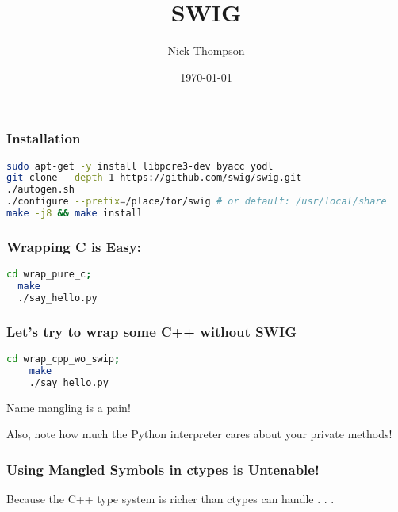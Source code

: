 \documentclass{beamer}
\begin{document}
\title{SWIG}
\author{Nick Thompson} 
\date{\today} 

\frame{\titlepage} 


\begin{frame}[fragile]
\frametitle{Installation}

\begin{lstlisting}[language=bash]
sudo apt-get -y install libpcre3-dev byacc yodl
git clone --depth 1 https://github.com/swig/swig.git
./autogen.sh
./configure --prefix=/place/for/swig # or default: /usr/local/share
make -j8 && make install
\end{lstlisting}
\end{frame}

\begin{frame}[fragile]
\frametitle{Wrapping C is Easy:}
\begin{lstlisting}[language=bash]
  cd wrap_pure_c;
  make
  ./say_hello.py
\end{lstlisting}
\end{frame}

\begin{frame}[fragile]
  \frametitle{Let's try to wrap some C++ without SWIG}
  \begin{lstlisting}[language=bash]
    cd wrap_cpp_wo_swip;
    make
    ./say_hello.py
  \end{lstlisting}
  Name mangling is a pain!
  
  Also, note how much the Python interpreter cares about your private methods!
\end{frame}

\begin{frame}
  \frametitle{Using Mangled Symbols in ctypes is Untenable!}
  Because the C++ type system is richer than ctypes can handle . . . 
\end{frame}
\end{document}
